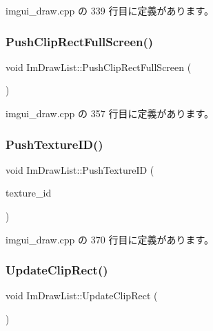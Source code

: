  imgui\+\_\+draw.\+cpp の 339 行目に定義があります。

\mbox{\label{struct_im_draw_list_a0ab1ab409f0e269755e50a77901bae39}} 
\subsubsection{\texorpdfstring{Push\+Clip\+Rect\+Full\+Screen()}{PushClipRectFullScreen()}}
{\footnotesize\ttfamily void Im\+Draw\+List\+::\+Push\+Clip\+Rect\+Full\+Screen (\begin{DoxyParamCaption}{ }\end{DoxyParamCaption})}



 imgui\+\_\+draw.\+cpp の 357 行目に定義があります。

\mbox{\label{struct_im_draw_list_ac0dc0ecf692ab4c6ce58dd5381efb20d}} 
\subsubsection{\texorpdfstring{Push\+Texture\+I\+D()}{PushTextureID()}}
{\footnotesize\ttfamily void Im\+Draw\+List\+::\+Push\+Texture\+ID (\begin{DoxyParamCaption}\item[{const \mbox{\hyperlink{imgui_8h_a364f4447ecbc4ca176145ccff9db6286}{Im\+Texture\+ID}} \&}]{texture\+\_\+id }\end{DoxyParamCaption})}



 imgui\+\_\+draw.\+cpp の 370 行目に定義があります。

\mbox{\label{struct_im_draw_list_a5978db1fc49be781978699e85c6a3251}} 
\subsubsection{\texorpdfstring{Update\+Clip\+Rect()}{UpdateClipRect()}}
{\footnotesize\ttfamily void Im\+Draw\+List\+::\+Update\+Clip\+Rect (\begin{DoxyParamCaption}{ }\end{DoxyParamCaption})}



